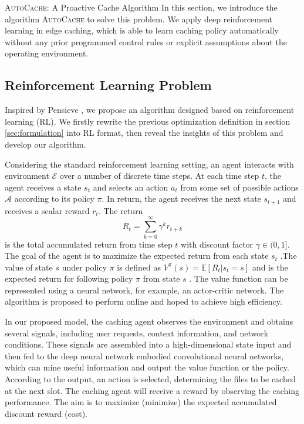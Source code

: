 \documentclass{article}
\begin{document}
\begin{section}{\textsc{AutoCache}: A Proactive Cache Algorithm}
    \label{sec:algorithm}
    In this section, we introduce the algorithm \textsc{AutoCache} to solve this problem. We apply deep reinforcement learning in edge caching, which is able to learn caching policy automatically without any prior programmed control rules or explicit assumptions about the operating environment.
    
    \subsection{Reinforcement Learning Problem}
    Inspired by Pensieve \cite{Pensieve}, we propose an algorithm designed based on reinforcement learning (RL). We firstly rewrite the previous optimization definition in section \ref{sec:formulation} into RL format, then reveal the insights of this problem and develop our algorithm.

    Considering the standard reinforcement learning setting, an agent interacts with environment $\mathcal{E}$ over a number of discrete time steps. At each time step $t$, the agent receives a state $s_t$ and selects an action $a_t$ from some set of possible actions $\mathcal{A}$ according to its policy $\pi$. In return, the agent receives the next state $s_{t+1}$ and receives a scalar reward $r_t$. The return
    $$
    R_t=\sum_{k=0}^{\infty}\gamma^k r_{t+k}
    $$
    is the total accumulated return from time step $t$ with discount factor $\gamma\in(0,1]$. The goal of the agent is to maximize the expected return from each state $s_t$ \cite{rl-intro}.The value of state $s$ under policy $\pi$ is defined as $V^{\pi}(s)=\mathbb{E}[R_t|s_t=s]$ and is the expected return for following policy $\pi$ from state $s$ \cite{DBLP:journals/corr/MnihBMGLHSK16}. The value function can be represented using a neural network, for example, an actor-critic network. The algorithm is proposed to perform online and hoped to achieve high efficiency.

    In our proposed model, the caching agent observes the environment and obtains several signals, including user requests, context information, and network conditions. These signals are assembled into a high-dimensional state input and then fed to the deep neural network embodied convolutional neural networks, which can mine useful information and output the value function or the policy. According to the output, an action is selected, determining the files to be cached at the next slot. The caching agent will receive a reward by observing the caching performance. The aim is to maximize (minimize) the expected accumulated discount reward (cost).


\end{section}
\end{document}
